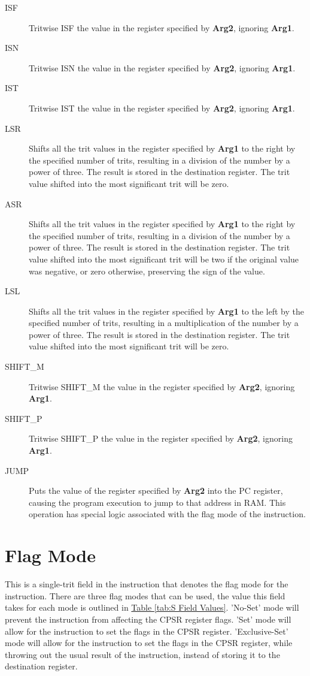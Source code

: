 \documentclass[12pt]{article}
\begin{document}
\begin{description}
\item[ISF] Tritwise ISF the value in the register specified by \textbf{Arg2}, ignoring \textbf{Arg1}.
\item[ISN] Tritwise ISN the value in the register specified by \textbf{Arg2}, ignoring \textbf{Arg1}.
\item[IST] Tritwise IST the value in the register specified by \textbf{Arg2}, ignoring \textbf{Arg1}.
\item[LSR] Shifts all the trit values in the register specified by \textbf{Arg1} to the right by
the specified number of trits, resulting in a division of the number by a power of three. The result is
stored in the destination register. The trit value shifted into the most significant trit will be zero.
\item[ASR] Shifts all the trit values in the register specified by \textbf{Arg1} to the right by
the specified number of trits, resulting in a division of the number by a power of three. The result is
stored in the destination register. The trit value shifted into the most significant trit will be two
if the original value was negative, or zero otherwise, preserving the sign of the value. 
\item[LSL] Shifts all the trit values in the register specified by \textbf{Arg1} to the left by
the specified number of trits, resulting in a multiplication of the number by a power of three. The
result is stored in the destination register. The trit value shifted into the most significant trit will
be zero.
\item[SHIFT\_M] Tritwise SHIFT\_M the value in the register specified by \textbf{Arg2}, ignoring \textbf{Arg1}.
\item[SHIFT\_P] Tritwise SHIFT\_P the value in the register specified by \textbf{Arg2}, ignoring \textbf{Arg1}.
\item[JUMP] Puts the value of the register specified by \textbf{Arg2} into the PC register, causing the
program execution to jump to that address in RAM. This operation has special logic associated with the
flag mode of the instruction.
\end{description}

\section{Flag Mode} \label{sec:Flag Mode}

This is a single-trit field in the instruction that denotes the flag mode for the instruction. There are
three flag modes that can be used, the value this field takes for each mode is outlined in
\hyperref[tab:S Field Values]{Table \ref{tab:S Field Values}}. 'No-Set' mode will prevent the instruction from
affecting the CPSR register flags. 'Set' mode will allow for the instruction to set the flags in the CPSR
register. 'Exclusive-Set' mode will allow for the instruction to set the flags in the CPSR register, while
throwing out the usual result of the instruction, instead of storing it to the destination register.
\end{document}

